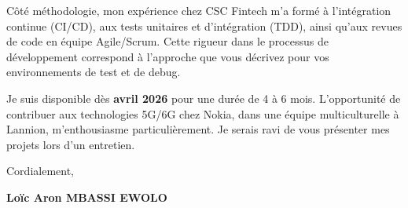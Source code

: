 \documentclass[a4paper,11pt]{article}
\begin{document}
Côté méthodologie, mon expérience chez CSC Fintech m'a formé à l'intégration continue (CI/CD), aux tests unitaires et d'intégration (TDD), ainsi qu'aux revues de code en équipe Agile/Scrum. Cette rigueur dans le processus de développement correspond à l'approche que vous décrivez pour vos environnements de test et de debug.

Je suis disponible dès \textbf{avril 2026} pour une durée de 4 à 6 mois. L'opportunité de contribuer aux technologies 5G/6G chez Nokia, dans une équipe multiculturelle à Lannion, m'enthousiasme particulièrement. Je serais ravi de vous présenter mes projets lors d'un entretien.

Cordialement,

\vspace{0.8cm}

\textbf{Loïc Aron MBASSI EWOLO}
\end{document}
